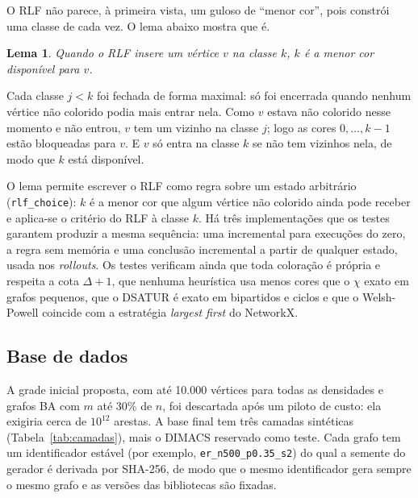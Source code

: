 \documentclass[conference,a4paper]{IEEEtran}
\newtheorem{lema}{Lema}
\begin{document}
O RLF não parece, à primeira vista, um guloso de ``menor cor'', pois constrói uma classe de
cada vez. O lema abaixo mostra que é.

\begin{lema}\label{lema:rlf}
Quando o RLF insere um vértice $v$ na classe $k$, $k$ é a menor cor disponível para $v$.
\end{lema}
\begin{IEEEproof}
Cada classe $j<k$ foi fechada de forma maximal: só foi encerrada quando nenhum vértice não
colorido podia mais entrar nela. Como $v$ estava não colorido nesse momento e não entrou, $v$
tem um vizinho na classe $j$; logo as cores $0,\dots,k-1$ estão bloqueadas para $v$. E $v$ só
entra na classe $k$ se não tem vizinhos nela, de modo que $k$ está disponível.
\end{IEEEproof}

O lema permite escrever o RLF como regra sobre um estado arbitrário (\texttt{rlf\_choice}):
$k$ é a menor cor que algum vértice não colorido ainda pode receber e aplica-se o critério do
RLF à classe $k$. Há três implementações que os testes garantem produzir a mesma sequência:
uma incremental para execuções do zero, a regra sem memória e uma conclusão incremental a
partir de qualquer estado, usada nos \emph{rollouts}. Os testes verificam ainda que toda
coloração é própria e respeita a cota $\Delta+1$, que nenhuma heurística usa menos cores que o
$\chi$ exato em grafos pequenos, que o DSATUR é exato em bipartidos e ciclos e que o
Welsh-Powell coincide com a estratégia \emph{largest first} do NetworkX.

\subsection{Base de dados}\label{sec:base}
A grade inicial proposta, com até 10.000 vértices para todas as densidades e grafos BA com $m$
até 30\% de $n$, foi descartada após um piloto de custo: ela exigiria cerca de $10^{12}$
arestas. A base final tem três camadas sintéticas (Tabela~\ref{tab:camadas}), mais o DIMACS
reservado como teste. Cada grafo tem um identificador estável (por exemplo,
\texttt{er\_n500\_p0.35\_s2}) do qual a semente do gerador é derivada por SHA-256, de modo que
o mesmo identificador gera sempre o mesmo grafo e as versões das bibliotecas são fixadas.
\end{document}
